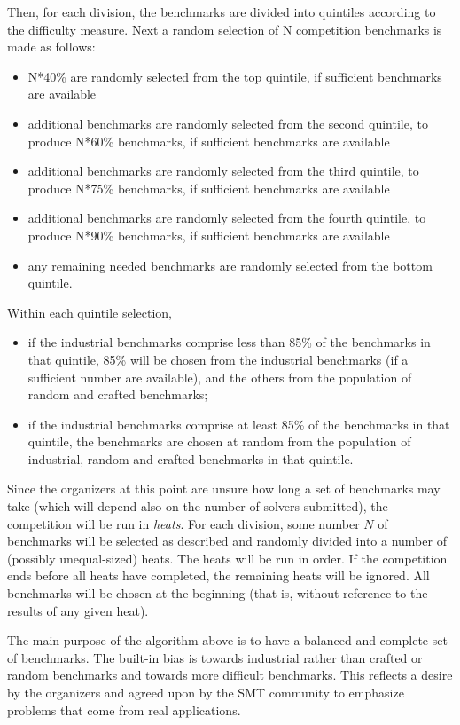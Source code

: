 \documentclass[12pt]{article}
\begin{document}
Then, for each division, the benchmarks are divided into quintiles according to the difficulty measure.
Next a random selection of N competition benchmarks is made as follows:
\begin{itemize}
\item N*40\% are randomly selected from the top quintile, if sufficient benchmarks are available
\item additional benchmarks are randomly selected from the second quintile, to produce N*60\% benchmarks, if sufficient benchmarks are available
\item additional benchmarks are randomly selected from the third quintile, to produce N*75\% benchmarks, if sufficient benchmarks are available
\item additional benchmarks are randomly selected from the fourth quintile, to produce N*90\% benchmarks, if sufficient benchmarks are available
\item any remaining needed benchmarks are randomly selected from the bottom quintile.
\end{itemize}
Within each quintile selection,
\begin{itemize}
\item if the industrial benchmarks comprise less than 85\% of the benchmarks in that quintile, 85\% will be chosen from the industrial benchmarks (if a sufficient number are available), and the others from the population of random and crafted benchmarks;
\item if the industrial benchmarks comprise at least 85\% of the benchmarks in that quintile, the benchmarks are chosen at random from the population of industrial, random and crafted benchmarks in that quintile.
\end{itemize}

Since the organizers at this point are unsure how long a set of benchmarks may take (which will depend also on the number of solvers submitted), the competition will be run in {\em heats}. For each division, some number $N$ of benchmarks will be selected as described and randomly divided into a number of (possibly unequal-sized) heats. The heats will be run in order. If the competition ends before all heats have completed, the remaining heats will be ignored. All benchmarks will be chosen at the beginning (that is, without reference to the results of any given heat).

The main purpose of the algorithm above is to have a balanced and complete set
of benchmarks.  The  built-in bias is towards industrial rather than crafted
or random benchmarks and towards more difficult benchmarks.
  This reflects a desire by the organizers and agreed upon
by the SMT community to emphasize problems that come from real applications.
\end{document}
